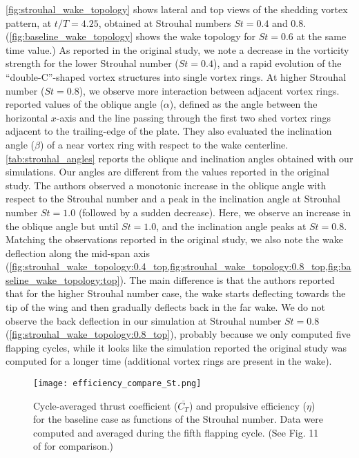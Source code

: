 \cref{fig:strouhal_wake_topology} shows lateral and top views of the shedding vortex pattern, at $t/T = 4.25$, obtained at Strouhal numbers $St = 0.4$ and $0.8$.
(\cref{fig:baseline_wake_topology} shows the wake topology for $St = 0.6$ at the same time value.)
As reported in the original study, we note a decrease in the vorticity strength for the lower Strouhal number ($St = 0.4$), and a rapid evolution of the ``double-C''-shaped vortex structures into single vortex rings.
At higher Strouhal number ($St = 0.8$), we observe more interaction between adjacent vortex rings.
\citet{li_dong_2016} reported values of the oblique angle ($\alpha$), defined as the angle between the horizontal $x$-axis and the line passing through the first two shed vortex rings adjacent to the trailing-edge of the plate.
They also evaluated the inclination angle ($\beta$) of a near vortex ring with respect to the wake centerline.
\cref{tab:strouhal_angles} reports the oblique and inclination angles obtained with our simulations.
Our angles are different from the values reported in the original study.
The authors observed a monotonic increase in the oblique angle with respect to the Strouhal number and a peak in the inclination angle at Strouhal number $St = 1.0$ (followed by a sudden decrease).
Here, we observe an increase in the oblique angle but until $St = 1.0$, and the inclination angle peaks at $St = 0.8$.
Matching the observations reported in the original study, we also note the wake deflection along the mid-span axis (\cref{fig:strouhal_wake_topology:0.4_top,fig:strouhal_wake_topology:0.8_top,fig:baseline_wake_topology:top}).
The main difference is that the authors reported that for the higher Strouhal number case, the wake starts deflecting towards the tip of the wing and then gradually deflects back in the far wake.
We do not observe the back deflection in our simulation at Strouhal number $St = 0.8$ (\cref{fig:strouhal_wake_topology:0.8_top}), probably because we only computed five flapping cycles, while it looks like the simulation reported the original study was computed for a longer time (additional vortex rings are present in the wake).

\begin{figure}[!h]
  \centering
  \texttt{[image: efficiency\_compare\_St.png]}
  \caption{Cycle-averaged thrust coefficient ($\overline{C_T}$) and propulsive efficiency ($\eta$) for the baseline case as functions of the Strouhal number. Data were computed and averaged during the fifth flapping cycle. (See Fig. 11 of \citet{li_dong_2016} for comparison.)}
  \label{fig:strouhal_propulsive_efficiency}
\end{figure}

